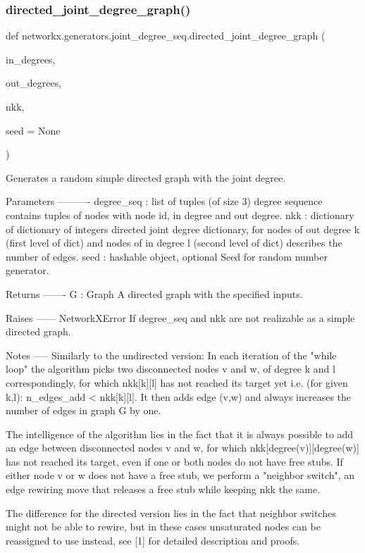 \subsubsection{\texorpdfstring{directed\+\_\+joint\+\_\+degree\+\_\+graph()}{directed\_joint\_degree\_graph()}}
{\footnotesize\ttfamily def networkx.\+generators.\+joint\+\_\+degree\+\_\+seq.\+directed\+\_\+joint\+\_\+degree\+\_\+graph (\begin{DoxyParamCaption}\item[{}]{in\+\_\+degrees,  }\item[{}]{out\+\_\+degrees,  }\item[{}]{nkk,  }\item[{}]{seed = {\ttfamily None} }\end{DoxyParamCaption})}

\begin{DoxyVerb}Generates a random simple directed graph with the joint degree.

Parameters
----------
degree_seq :  list of tuples (of size 3)
    degree sequence contains tuples of nodes with node id, in degree and
    out degree.
nkk  :  dictionary of dictionary of integers
    directed joint degree dictionary, for nodes of out degree k (first
    level of dict) and nodes of in degree l (second level of dict)
    describes the number of edges.
seed : hashable object, optional
    Seed for random number generator.

Returns
-------
G : Graph
    A directed graph with the specified inputs.

Raises
------
NetworkXError
    If degree_seq and nkk are not realizable as a simple directed graph.


Notes
-----
Similarly to the undirected version:
In each iteration of the "while loop" the algorithm picks two disconnected
nodes v and w, of degree k and l correspondingly,  for which nkk[k][l] has
not reached its target yet i.e. (for given k,l): n_edges_add < nkk[k][l].
It then adds edge (v,w) and always increases the number of edges in graph G
by one.

The intelligence of the algorithm lies in the fact that  it is always
possible to add an edge between disconnected nodes v and w, for which
nkk[degree(v)][degree(w)] has not reached its target, even if one or both
nodes do not have free stubs. If either node v or w does not have a free
stub, we perform a "neighbor switch", an edge rewiring move that releases a
free stub while keeping nkk the same.

The difference for the directed version lies in the fact that neighbor
switches might not be able to rewire, but in these cases unsaturated nodes
can be reassigned to use instead, see [1] for detailed description and
proofs.


\end{DoxyVerb}
